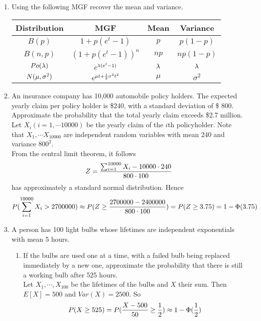 \documentclass[12pt]{article}%
\newcommand{\0}{{\bf 0}}
\begin{document}
\begin{enumerate}
\item
Using the following MGF
recover the mean and variance.
{\small
\begin{table}[H]    \center
\begin{tabular}{|c|c|c|c|} \hline
Distribution&MGF&Mean&Variance\\ \hline \hline
$B(p)$&$1+p(e^t-1)$&$p$&$p(1-p)$\\\hline
$B(n,p)$&$(1+p(e^t-1))^n$&$np$&$np(1-p)$\\\hline
$Po(\lambda)$&$e^{\lambda (e^t-1)}$&$\lambda$&$\lambda$\\\hline
$N(\mu,\sigma^2)$&$e^{\mu t+\frac{1}{2}\sigma^2t^2}$&$\mu$&$\sigma^2$\\\hline
\end{tabular}
\end{table}
}


\item
An insurance company has 10,000 automobile policy holders. The expected yearly claim per policy holder is \$240, with a standard deviation of \$ 800. Approximate the probability that the total yearly claim exceeds \$2.7 million.
\\
{\color{blue}{\bf Sol.}}
Let $X_i (i = 1,\cdots 10000)$ be the yearly claim of the $i$th policyholder. Note that
$X_1, \cdots X_{10000}$ are independent random variables with mean 240 and variance $800^2$.
\\
From the central limit theorem, it follows
$$Z=\frac{\sum_{i=1}^{10000} X_i -10000\cdot 240}{800\cdot 100}$$
has approximately a standard normal distribution. Hence
$$P(\sum_{i=1}^{10000} X_i>2700000) \approx P(Z \ge \frac{2700000-2400000}{800\cdot 100})=P(Z \ge 3.75)=1-\Phi(3.75) $$







\item
A person has 100 light bulbs whose lifetimes are independent exponentials with mean 5 hours. 
\begin{enumerate}
\item
If the bulbs are used one at a time, with a failed bulb being replaced immediately by a new one, approximate the probability that there is still a working bulb after 525 hours.
\\
{\color{blue}{\bf Sol.}}
Let $X_1,\cdots ,X_{100}$ be the lifetimes of the bulbs and $X$ their sum. Then $E[X] = 500$ and $Var(X) = 2500$. So
$$P(X \ge 525)=P(\frac{X-500}{50}\ge\frac{1}{2}) \approx 1- \Phi(\frac{1}{2})$$




\end{enumerate}
\end{enumerate}
\end{document}
